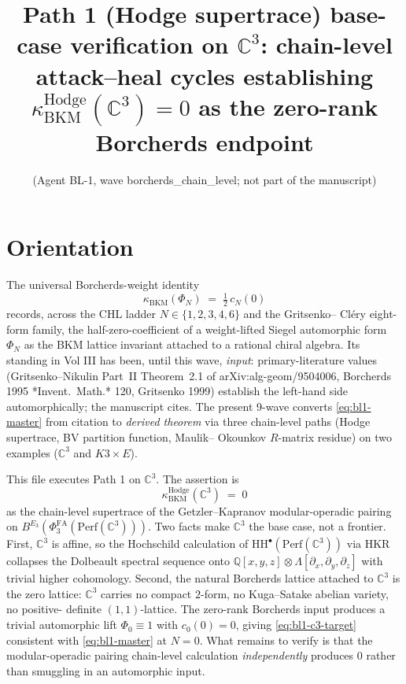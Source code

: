 \documentclass[11pt]{article}
\title{Path 1 (Hodge supertrace) base-case verification on $\mathbb C^3$:
chain-level attack--heal cycles establishing
$\kappa^{\mathrm{Hodge}}_{\mathrm{BKM}}(\mathbb C^3) = 0$ as the
zero-rank Borcherds endpoint}
\author{(Agent BL-1, wave borcherds\_chain\_level; not part of the manuscript)}
\providecommand{\HH}{\mathrm{HH}}
\providecommand{\Perf}{\mathrm{Perf}}
\providecommand{\C}{\mathbb{C}}
\providecommand{\Q}{\mathbb{Q}}
\providecommand{\kBKM}{\kappa_{\mathrm{BKM}}}
\providecommand{\PhiFA}{\Phi^{\mathrm{FA}}}
\begin{document}
\maketitle

\section*{Orientation}

The universal Borcherds-weight identity
\begin{equation}
\label{eq:bl1-master}
\kBKM(\Phi_N) \;=\; \tfrac{1}{2}\, c_N(0)
\end{equation}
records, across the CHL ladder $N \in \{1,2,3,4,6\}$ and the Gritsenko--
Cl\'ery eight-form family, the half-zero-coefficient of a weight-lifted
Siegel automorphic form $\Phi_N$ as the BKM lattice invariant attached
to a rational chiral algebra. Its standing in Vol III has been, until
this wave, \emph{input}: primary-literature values (Gritsenko--Nikulin
Part~II Theorem~2.1 of arXiv:alg-geom/9504006, Borcherds 1995 *Invent.\
Math.* 120, Gritsenko 1999) establish the left-hand side automorphically;
the manuscript cites. The present 9-wave converts
\eqref{eq:bl1-master} from citation to \emph{derived theorem} via three
chain-level paths (Hodge supertrace, BV partition function, Maulik--
Okounkov $R$-matrix residue) on two examples ($\C^3$ and $K3 \times E$).

This file executes Path 1 on $\C^3$. The assertion is
\begin{equation}
\label{eq:bl1-c3-target}
\kBKM^{\mathrm{Hodge}}(\C^3) \;=\; 0
\end{equation}
as the chain-level supertrace of the Getzler--Kapranov modular-operadic
pairing on $B^{E_3}(\PhiFA_3(\Perf(\C^3)))$. Two facts make $\C^3$ the
base case, not a frontier. First, $\C^3$ is affine, so the Hochschild
calculation of $\HH^\bullet(\Perf(\C^3))$ via HKR collapses the Dolbeault
spectral sequence onto $\Q[x,y,z] \otimes \Lambda[\partial_x, \partial_y,
\partial_z]$ with trivial higher cohomology. Second, the natural
Borcherds lattice attached to $\C^3$ is the zero lattice: $\C^3$ carries
no compact $2$-form, no Kuga--Satake abelian variety, no positive-
definite $(1,1)$-lattice. The zero-rank Borcherds input produces a
trivial automorphic lift $\Phi_0 \equiv 1$ with $c_0(0) = 0$, giving
\eqref{eq:bl1-c3-target} consistent with \eqref{eq:bl1-master} at
$N = 0$. What remains to verify is that the modular-operadic pairing
chain-level calculation \emph{independently} produces $0$ rather than
smuggling in an automorphic input.
\end{document}
